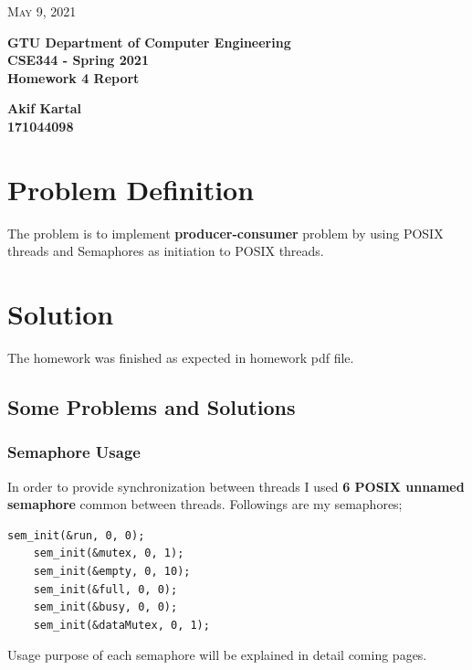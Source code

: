 \documentclass{article}
\begin{document}
\begin{titlepage}

	\begin{flushright}
	\textsc{\large May 9, 2021} \\
	\end{flushright}
	\begin{center}
	\Large{\bfseries GTU Department of Computer Engineering \\ CSE344 - Spring 2021 \\ Homework 4 Report  } \\
	\end{center}
	\vspace*{\fill}
	\begin{center}
	\Large{\bfseries Akif Kartal \\ 171044098 }
	\end{center}
	\vspace*{\fill}

\end{titlepage}

\cleardoublepage
\section{Problem Definition}
The problem is to implement \textbf{producer-consumer} problem by using POSIX threads and Semaphores as initiation to POSIX threads. 

\section{Solution}
The homework was finished as expected in homework pdf file. 
\subsection{Some Problems and Solutions}
\subsubsection{Semaphore Usage}
In order to provide synchronization between threads I used \textbf{6 POSIX unnamed semaphore} common between threads.
Followings are my semaphores;
\begin{lstlisting}[style=CStyle]
    sem_init(&run, 0, 0);
    sem_init(&mutex, 0, 1);
    sem_init(&empty, 0, 10);
    sem_init(&full, 0, 0);
    sem_init(&busy, 0, 0);
    sem_init(&dataMutex, 0, 1);
\end{lstlisting}
Usage purpose of each semaphore will be explained in detail coming pages.
\end{document}
